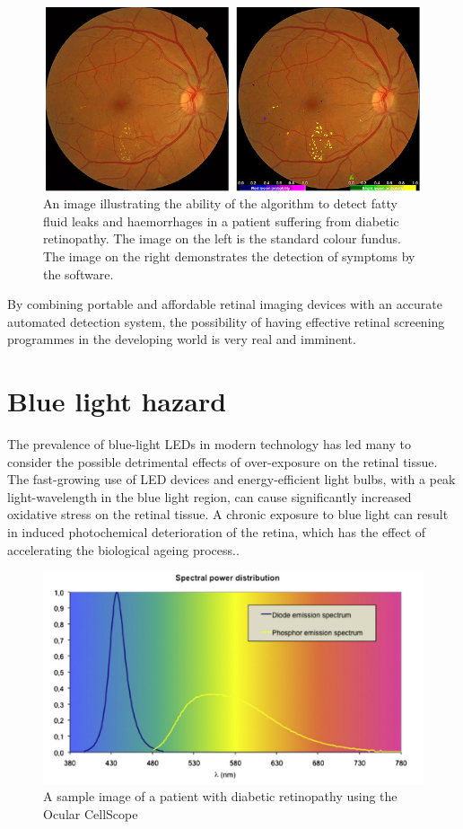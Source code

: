 \begin{figure}[htbp]
\centering
\includegraphics{figures/autodr}
\caption{An image illustrating the ability of the algorithm to detect fatty fluid leaks
and haemorrhages in a patient suffering from diabetic retinopathy. The image on the left
is the standard colour fundus. The image on the right demonstrates the detection of
symptoms by the software.}
\label{fig:autodr}
\end{figure}

By combining portable and affordable retinal imaging devices with an accurate automated
detection system, the possibility of having effective retinal screening programmes in the
developing world is very real and imminent.


\section{Blue light hazard}

The prevalence of blue-light LEDs in modern technology has led many to consider the
possible detrimental effects of over-exposure on the retinal tissue. The fast-growing
use of LED devices and energy-efficient light bulbs, with a peak light-wavelength
in the blue light region, can cause significantly increased oxidative stress on the
retinal tissue.\cite{shang_wang} A chronic exposure to blue light can result in
induced photochemical deterioration of the retina, which has the effect of accelerating
the biological ageing process.\cite{behar_cohen_2011}.

\begin{figure}[htbp]
\centering
\includegraphics{figures/bluehazard}
\caption{A sample image of a patient with diabetic retinopathy using the Ocular CellScope}
\label{fig:bluehaz}
\end{figure}


